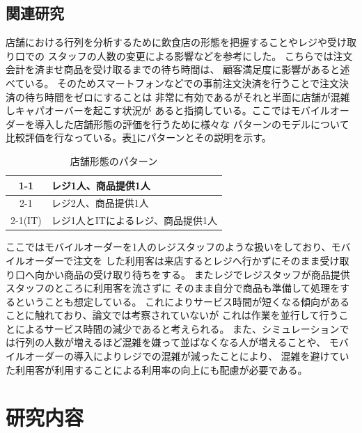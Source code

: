 \documentclass{jsarticle}
\begin{document}
\newpage

\subsection{関連研究}

店舗における行列を分析するために飲食店の形態を把握することやレジや受け取り口での
スタッフの人数の変更による影響などを参考にした。
こちらでは注文会計を済ませ商品を受け取るまでの待ち時間は、
顧客満足度に影響がある\cite{bibi8}と述べている。
そのためスマートフォンなどでの事前注文決済を行うことで注文決済の待ち時間をゼロにすることは
非常に有効であるがそれと半面に店舗が混雑しキャパオーバーを起こす状況\cite{bibi2}が
あると指摘している。ここではモバイルオーダーを導入した店舗形態の評価を行うために様々な
パターンのモデルについて比較評価を行なっている。表\ref{table1}にパターンとその説明を示す。

\begin{table}[H]
 \begin{center}
   \caption{店舗形態のパターン}
  \begin{tabular}{|c|l|} \hline
1-1     & レジ1人、商品提供1人\\ \hline
2-1     & レジ2人、商品提供1人\\ \hline
2-1(IT) & レジ1人とITによるレジ、商品提供1人\\ \hline
  \end{tabular}
 \label{table1}
 \end{center}
\end{table}

ここではモバイルオーダーを1人のレジスタッフのような扱いをしており、モバイルオーダーで注文を
した利用客は来店するとレジへ行かずにそのまま受け取り口へ向かい商品の受け取り待ちをする。
またレジでレジスタッフが商品提供スタッフのところに利用客を流さずに
そのまま自分で商品も準備して処理をするということも想定している。
これによりサービス時間が短くなる傾向があることに触れており、論文では考察されていないが
これは作業を並行して行うことによるサービス時間の減少であると考えられる。
また、シミュレーションでは行列の人数が増えるほど混雑を嫌って並ばなくなる人が増えることや、
モバイルオーダーの導入によりレジでの混雑が減ったことにより、
混雑を避けていた利用客が利用することによる利用率の向上にも配慮が必要である。





\newpage

\section{研究内容}
\end{document}
